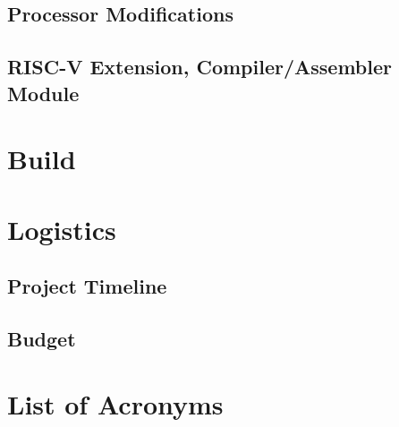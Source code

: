 \documentclass[11pt, oneside]{article}      %
\begin{document}
\subsection{Processor Modifications}

\subsection{RISC-V Extension, Compiler/Assembler Module}

\section{Build}

\section{Logistics}
\subsection{Project Timeline}
\subsection{Budget}

\section{List of Acronyms}



\clearpage



\end{document}

